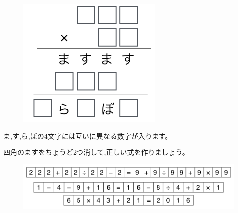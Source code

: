 
\begin{figure}[h]
\centering
\includegraphics[width =7cm]{sp1puzzle1}
\end{figure}

ま,す,ら,ぼの4文字には互いに異なる数字が入ります。

四角のますをちょうど2つ消して,正しい式を作りましょう。
\begin{figure}[h]
\centering
\includegraphics[width =12cm]{sp1puzzle2}
\end{figure}

